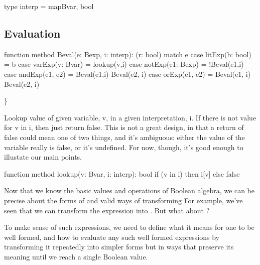 \documentclass[letterpaper,10pt,english]{sphinxmanual}
\begin{document}
\begin{sphinxVerbatim}[commandchars=\\\{\}]
type interp = map\PYGZlt{}Bvar, bool\PYGZgt{}
\end{sphinxVerbatim}


\subsection{Evaluation}
\label{\detokenize{08-propositional-logic:evaluation}}
\begin{sphinxVerbatim}[commandchars=\\\{\}]
function method Beval(e: Bexp, i: interp): (r: bool)
\PYGZob{}
    match e
    \PYGZob{}
        case litExp(b: bool) =\PYGZgt{} b
        case varExp(v: Bvar) =\PYGZgt{} lookup(v,i)
        case notExp(e1: Bexp) =\PYGZgt{} !Beval(e1,i)
        case andExp(e1, e2) =\PYGZgt{} Beval(e1,i) \PYGZam{}\PYGZam{} Beval(e2, i)
        case orExp(e1, e2) =\PYGZgt{}  Beval(e1, i) \textbar{}\textbar{} Beval(e2, i)
    \PYGZcb{}
\PYGZcb{}
\end{sphinxVerbatim}

\}

Lookup value of given variable, v, in a given interpretation, i. If
there is not value for v in i, then just return false. This is not a
great design, in that a return of false could mean one of two things,
and it’s ambiguous: either the value of the variable really is false,
or it’s undefined.  For now, though, it’s good enough to illustate our
main points.

\begin{sphinxVerbatim}[commandchars=\\\{\}]
function method lookup(v: Bvar, i: interp): bool
\PYGZob{}
    if (v in i) then i[v]
    else false
\PYGZcb{}
\end{sphinxVerbatim}

Now that we know the basic values and operations of Boolean algebra,
we can be precise about the forms of and valid ways of transforming
 For example, we’ve seen that we can transform
the expression  into . But what about ?

To make sense of such expressions, we need to define what it means for
one to be well formed, and how to evaluate any such well formed
expressions by transforming it repeatedly into simpler forms but in
ways that preserve its meaning until we reach a single Boolean value.
\end{document}
